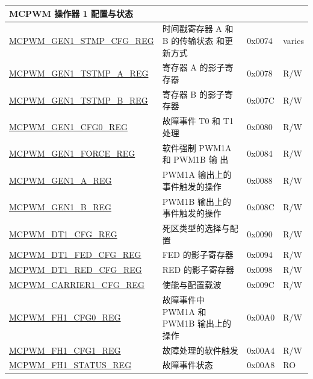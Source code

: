 \begin{longtable}{ | p{6cm} | p{7.2cm} | p{1.2cm} | p{1cm} | }
\multicolumn{4}{|l|}{\textbf{MCPWM 操作器 1 配置与状态}} \\ \hline
\hyperref[regdesc:MCPWMGEN1STMPCFGREG]{MCPWM\_GEN1\_STMP\_CFG\_REG} & 时间戳寄存器 A 和 B 的传输状态 和更新方式 & 0x0074 & varies\\ \hline
\hyperref[regdesc:MCPWMGEN1TSTMPAREG]{MCPWM\_GEN1\_TSTMP\_A\_REG} & 寄存器 A 的影子寄存器 & 0x0078 &  R/W \\ \hline
\hyperref[regdesc:MCPWMGEN1TSTMPBREG]{MCPWM\_GEN1\_TSTMP\_B\_REG} & 寄存器 B 的影子寄存器 & 0x007C & R/W \\ \hline
\hyperref[regdesc:MCPWMGEN1CFG0REG]{MCPWM\_GEN1\_CFG0\_REG} & 故障事件 T0 和 T1 处理 &  0x0080 &  R/W \\ \hline
\hyperref[regdesc:MCPWMGEN1FORCEREG]{MCPWM\_GEN1\_FORCE\_REG} & 软件强制 PWM1A 和 PWM1B 输 出 &  0x0084 & R/W \\ \hline
\hyperref[regdesc:MCPWMGEN1AREG]{MCPWM\_GEN1\_A\_REG} & PWM1A 输出上的事件触发的操作 & 0x0088 &  R/W \\ \hline
\hyperref[regdesc:MCPWMGEN1BREG]{MCPWM\_GEN1\_B\_REG} & PWM1B 输出上的事件触发的操作 & 0x008C & R/W \\ \hline
\hyperref[regdesc:MCPWMDT1CFGREG]{MCPWM\_DT1\_CFG\_REG} & 死区类型的选择与配置  & 0x0090  & R/W \\ \hline
\hyperref[regdesc:MCPWMDT1FEDCFGREG]{MCPWM\_DT1\_FED\_CFG\_REG} & FED 的影子寄存器 & 0x0094 & R/W \\ \hline
\hyperref[regdesc:MCPWMDT1REDCFGREG]{MCPWM\_DT1\_RED\_CFG\_REG} & RED 的影子寄存器 & 0x0098 & R/W \\ \hline
\hyperref[regdesc:MCPWMCARRIER1CFGREG]{MCPWM\_CARRIER1\_CFG\_REG} & 使能与配置载波 & 0x009C & R/W \\ \hline
\hyperref[regdesc:MCPWMFH1CFG0REG]{MCPWM\_FH1\_CFG0\_REG} & 故障事件中 PWM1A 和 PWM1B 输出上的操作 & 0x00A0 & R/W \\ \hline
\hyperref[regdesc:MCPWMFH1CFG1REG]{MCPWM\_FH1\_CFG1\_REG} & 故障处理的软件触发 & 0x00A4 &  R/W \\ \hline
\hyperref[regdesc:MCPWMFH1STATUSREG]{MCPWM\_FH1\_STATUS\_REG} & 故障事件状态 &0x00A8 & RO \\ \hline


\end{longtable}
